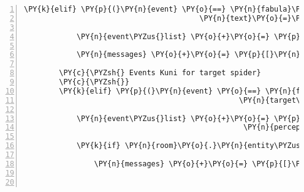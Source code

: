 \begin{Verbatim}[commandchars=\\\{\},numbers=left,firstnumber=1,stepnumber=1]
        \PY{k}{elif} \PY{p}{(}\PY{n}{event} \PY{o}{==} \PY{n}{fabula}\PY{o}{.}\PY{n}{SaysEvent}\PY{p}{(}\PY{n}{identifier}\PY{o}{=}\PY{n}{ID\PYZus{}KUNI}\PY{p}{,}
                                        \PY{n}{text}\PY{o}{=}\PY{l+s}{\PYZsq{}}\PY{l+s}{Geh mir aus dem Weg!}\PY{l+s}{\PYZsq{}}\PY{p}{)}\PY{p}{)}\PY{p}{:}

            \PY{n}{event\PYZus{}list} \PY{o}{+}\PY{o}{=} \PY{p}{[}\PY{n}{fabula}\PY{o}{.}\PY{n}{SaysEvent}\PY{p}{(}\PY{l+s}{\PYZsq{}}\PY{l+s}{spider}\PY{l+s}{\PYZsq{}}\PY{p}{,} \PY{l+s}{\PYZsq{}}\PY{l+s}{Du wärst ein guter Happen für zwischendurch!}\PY{l+s}{\PYZsq{}}\PY{p}{)}\PY{p}{]}

            \PY{n}{messages} \PY{o}{+}\PY{o}{=} \PY{p}{[}\PY{n}{fabula}\PY{o}{.}\PY{n}{Message}\PY{p}{(}\PY{p}{[}\PY{n}{fabula}\PY{o}{.}\PY{n}{SaysEvent}\PY{p}{(}\PY{n}{ID\PYZus{}KUNI}\PY{p}{,} \PY{l+s}{\PYZsq{}}\PY{l+s}{Mit der Spinne ist wohl nicht gut Kirschen essen!}\PY{l+s}{\PYZsq{}}\PY{p}{)}\PY{p}{]}\PY{p}{)}\PY{p}{]}

        \PY{c}{\PYZsh{} Events Kuni for target spider}
        \PY{c}{\PYZsh{}}
        \PY{k}{elif} \PY{p}{(}\PY{n}{event} \PY{o}{==} \PY{n}{fabula}\PY{o}{.}\PY{n}{TriesToLookAtEvent}\PY{p}{(}\PY{n}{identifier}\PY{o}{=}\PY{n}{ID\PYZus{}KUNI}\PY{p}{,}
                                                 \PY{n}{target\PYZus{}identifier}\PY{o}{=}\PY{l+s}{\PYZsq{}}\PY{l+s}{spider}\PY{l+s}{\PYZsq{}}\PY{p}{)}\PY{p}{)}\PY{p}{:}

            \PY{n}{event\PYZus{}list} \PY{o}{+}\PY{o}{=} \PY{p}{[}\PY{n}{fabula}\PY{o}{.}\PY{n}{PerceptionEvent}\PY{p}{(}\PY{n}{identifier}\PY{o}{=}\PY{n}{ID\PYZus{}KUNI}\PY{p}{,}
                                                  \PY{n}{perception}\PY{o}{=}\PY{l+s}{\PYZsq{}}\PY{l+s}{Woah, das ist aber eine große Spinne!}\PY{l+s}{\PYZsq{}}\PY{p}{)}\PY{p}{]}

            \PY{k}{if} \PY{n}{room}\PY{o}{.}\PY{n}{entity\PYZus{}locations}\PY{p}{[}\PY{l+s}{\PYZsq{}}\PY{l+s}{spider}\PY{l+s}{\PYZsq{}}\PY{p}{]} \PY{o}{==} \PY{p}{(}\PY{l+m+mi}{1}\PY{p}{,} \PY{l+m+mi}{0}\PY{p}{)}\PY{p}{:}

                \PY{n}{messages} \PY{o}{+}\PY{o}{=} \PY{p}{[}\PY{n}{fabula}\PY{o}{.}\PY{n}{Message}\PY{p}{(}\PY{p}{[}\PY{n}{fabula}\PY{o}{.}\PY{n}{PerceptionEvent}\PY{p}{(}\PY{n}{identifier}\PY{o}{=}\PY{n}{ID\PYZus{}KUNI}\PY{p}{,}
                                                                    \PY{n}{perception}\PY{o}{=}\PY{l+s}{\PYZsq{}}\PY{l+s}{Hinter der Spinne ist doch irgendwas!}\PY{l+s}{\PYZsq{}}\PY{p}{)}\PY{p}{]}\PY{p}{)}\PY{p}{]}


\end{Verbatim}
